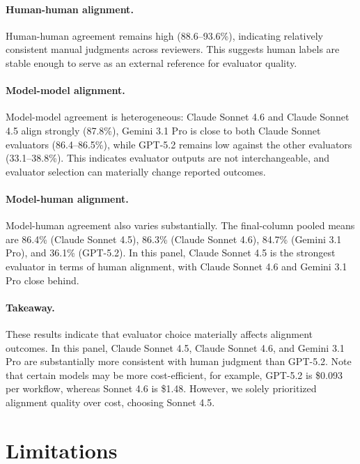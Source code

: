 \paragraph{Human-human alignment.}
Human-human agreement remains high (88.6--93.6\%), indicating relatively consistent manual judgments across reviewers. This suggests human labels are stable enough to serve as an external reference for evaluator quality.

\paragraph{Model-model alignment.}
Model-model agreement is heterogeneous: Claude Sonnet 4.6 and Claude Sonnet 4.5 align strongly (87.8\%), Gemini 3.1 Pro is close to both Claude Sonnet evaluators (86.4--86.5\%), while GPT-5.2 remains low against the other evaluators (33.1--38.8\%). This indicates evaluator outputs are not interchangeable, and evaluator selection can materially change reported outcomes.

\paragraph{Model-human alignment.}
Model-human agreement also varies substantially. The final-column pooled means are 86.4\% (Claude Sonnet 4.5), 86.3\% (Claude Sonnet 4.6), 84.7\% (Gemini 3.1 Pro), and 36.1\% (GPT-5.2). In this panel, Claude Sonnet 4.5 is the strongest evaluator in terms of human alignment, with Claude Sonnet 4.6 and Gemini 3.1 Pro close behind.

\paragraph{Takeaway.}
These results indicate that evaluator choice materially affects alignment outcomes. In this panel, Claude Sonnet 4.5, Claude Sonnet 4.6, and Gemini 3.1 Pro are substantially more consistent
with human judgment than GPT-5.2. Note that certain models may be more cost-efficient, for example, GPT-5.2 is \$0.093 per workflow, whereas Sonnet 4.6 is \$1.48. However, we solely prioritized alignment quality over cost, choosing Sonnet 4.5.

\section{Limitations}

